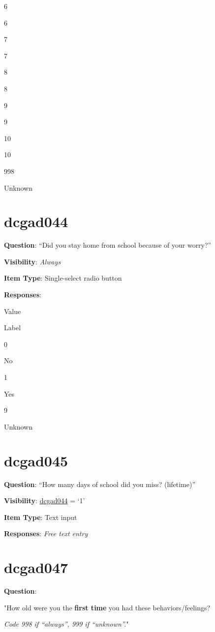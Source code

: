 \documentclass[]{book}
\begin{document}
6

6

7

7

8

8

9

9

10

10

998

Unknown

\hypertarget{dcgad044}{%
\section{dcgad044}\label{dcgad044}}

\textbf{Question}: ``Did you stay home from school because of your worry?''

\textbf{Visibility}: \emph{Always}

\textbf{Item Type}: Single-select radio button

\textbf{Responses}:

Value

Label

0

No

1

Yes

9

Unknown

\hypertarget{dcgad045}{%
\section{dcgad045}\label{dcgad045}}

\textbf{Question}: ``How many days of school did you miss? (lifetime)''

\textbf{Visibility}: \protect\hyperlink{dcgad044}{dcgad044} = `1'

\textbf{Item Type}: Text input

\textbf{Responses}: \emph{Free text entry}

\hypertarget{dcgad047}{%
\section{dcgad047}\label{dcgad047}}

\textbf{Question}:

"How old were you the \textbf{first time} you had these behaviors/feelings?

\emph{Code 998 if ``always'', 999 if ``unknown''.}"
\end{document}
